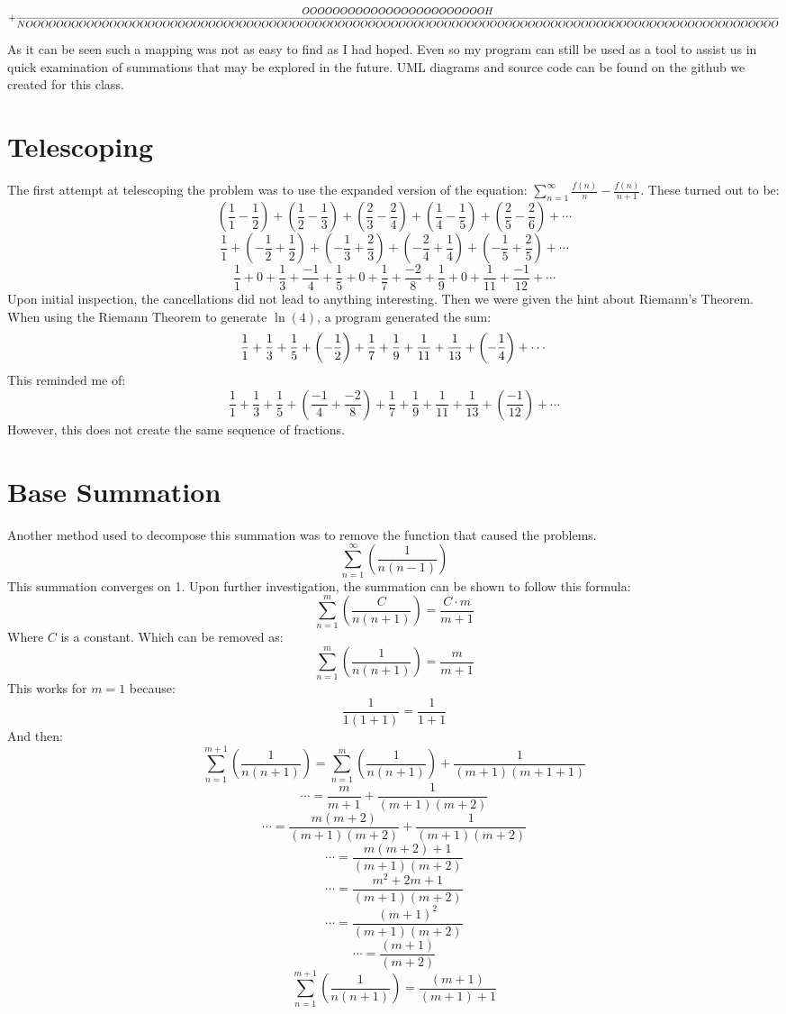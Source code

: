 \documentclass{article}
\begin{document}
$$
+{OOOOOOOOOOOOOOOOOOOOOOOOH \over NOOOOOOOOOOOOOOOOOOOOOOOOOOOOOOOOOOOOOOOOOOOOOOOOOOOOOOOOOOOOOOOOOOOOOOOOOOOOOOOOOOOOOOOOOOOOOOOOOOO}
$$

As it can be seen such a mapping was not as easy to find as I had hoped. Even so my program can still be used as a tool to assist us in quick examination of
summations that may be explored in the future. UML diagrams and source code can be found on the github we created for this class.

\section{Telescoping}
The first attempt at telescoping the problem was to use the expanded version of the equation: $\sum_{n=1}^\infty \frac{f(n)}{n} - \frac{f(n)}{n+1}$. These turned out to be:\\
$$\left(\frac{1}{1}-\frac{1}{2}\right)+\left(\frac{1}{2}-\frac{1}{3}\right)+\left(\frac{2}{3}-\frac{2}{4}\right)+\left(\frac{1}{4}-\frac{1}{5}\right)+\left(\frac{2}{5}-\frac{2}{6}\right)+\cdots$$
$$\frac{1}{1} + \left(-\frac{1}{2}+\frac{1}{2}\right) + \left(-\frac{1}{3}+\frac{2}{3}\right) +\left(-\frac{2}{4}+\frac{1}{4}\right)+\left(-\frac{1}{5}+\frac{2}{5}\right)+\cdots$$
$$\frac{1}{1}+0+\frac{1}{3}+\frac{-1}{4}+\frac{1}{5}+0+\frac{1}{7}+\frac{-2}{8}+\frac{1}{9}+0+\frac{1}{11}+\frac{-1}{12}+\cdots$$
Upon initial inspection, the cancellations did not lead to anything interesting. Then we were given the hint about Riemann's Theorem. When using the Riemann Theorem to generate $\ln(4)$, a program generated the sum:
$${1 \over 1}+{1 \over 3}+{1 \over 5}+\left(- {1 \over 2}\right)+{1 \over 7}+{1 \over 9}+{1 \over 11}+{1 \over 13}+\left(- {1 \over 4}\right)+ \cdots$$
This reminded me of:
$$\frac{1}{1}+\frac{1}{3}+\frac{1}{5}+\left(\frac{-1}{4}+\frac{-2}{8}\right)+\frac{1}{7}+\frac{1}{9}+\frac{1}{11}+\frac{1}{13}+\left(\frac{-1}{12}\right)+\cdots$$
However, this does not create the same sequence of fractions.

\section{Base Summation}
Another method used to decompose this summation was to remove the function that caused the problems.
$$\sum_{n=1}^\infty \left( \frac{1}{n(n-1)} \right)$$
This summation converges on 1. Upon further investigation, the summation can be shown to follow this formula:
$$\sum_{n=1}^m \left( \frac{C}{n(n+1)} \right) = \frac{C \cdot m}{m+1}$$
Where $C$ is a constant. Which can be removed as:
$$\sum_{n=1}^m \left( \frac{1}{n(n+1)} \right) = \frac{m}{m+1}$$
This works for $m=1$ because:
$$\frac{1}{1(1+1)}=\frac{1}{1+1}$$
And then:
$$\sum_{n=1}^{m+1} \left( \frac{1}{n(n+1)} \right) = \sum_{n=1}^{m} \left( \frac{1}{n(n+1)} \right) + \frac{1}{(m+1)(m+1+1)}$$
$$\cdots = \frac{m}{m+1} + \frac{1}{(m+1)(m+2)}$$
$$\cdots = \frac{m(m+2)}{(m+1)(m+2)} + \frac{1}{(m+1)(m+2)}$$
$$\cdots = \frac{m(m+2) + 1}{(m+1)(m+2)}$$
$$\cdots = \frac{m^2+2m+1}{(m+1)(m+2)}$$
$$\cdots = \frac{(m+1)^2}{(m+1)(m+2)}$$
$$\cdots = \frac{(m+1)}{(m+2)}$$
$$\sum_{n=1}^{m+1} \left( \frac{1}{n(n+1)} \right) = \frac{(m+1)}{(m+1)+1}$$
\end{document}
